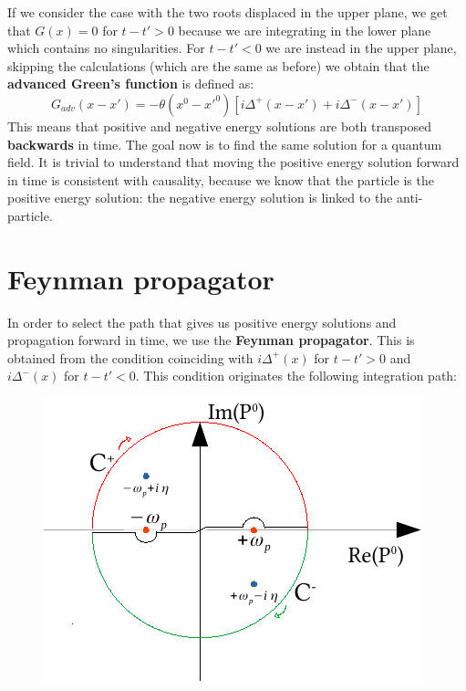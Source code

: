 \documentclass[../main.tex]{subfiles}
\begin{document}
If we consider the case with the two roots displaced in the upper plane, we get that $G(x)=0$ for $t-t'>0$ because we are integrating in the lower plane which contains no singularities. For $t-t'<0$ we are instead in the upper plane, skipping the calculations (which are the same as before) we obtain that the \textbf{advanced Green's function} is defined as:
\[
G_{adv}(x-x')=-\theta(x^0-x'^0)[i\Delta^+(x-x')+i\Delta^-(x-x')]
\]
This means that positive and negative energy solutions are both transposed \textbf{backwards} in time. The goal now is to find the same solution for a quantum field. It is trivial to understand that moving the positive energy solution forward in time is consistent with causality, because we know that the particle is the positive energy solution: the negative energy solution is linked to the anti-particle.
\section{Feynman propagator}
In order to select the path that gives us positive energy solutions and propagation forward in time, we use the \textbf{Feynman propagator}. This is obtained from the condition coinciding with $i\Delta^+(x)$ for $t-t'>0$ and $i\Delta^-(x)$ for $t-t'<0$. This condition originates the following integration path:
\begin{figure}[h!]
    \centering
    \includegraphics{Images/CamminiIntegrazioneFeynman.pdf}
    \caption*{}
\end{figure}
\end{document}
